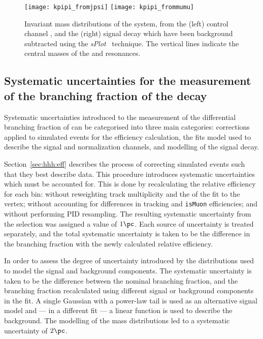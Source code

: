 \begin{figure}
  \begin{center}
    \texttt{[image: kpipi\_fromjpsi]}
    \texttt{[image: kpipi\_frommumu]}
    \caption[Invariant mass distributions of \kpipi]
    {
      Invariant mass distributions of the \kpipi system, from the
      (left) control channel \btojpsikpipi, and the
      (right) signal decay \btokpipimumu
      which have been background subtracted
      using the \emph{sPlot}~\cite{splot} technique.
      The vertical lines indicate the central masses of the  and 
      resonances.
    }
    \label{fig:kpipi:kpipi}
  \end{center}
\end{figure}



\subsection[Systematic uncertainties for the measurement of the branching fraction of the decay
  \btokpipimumu]{Systematic uncertainties for the measurement of the branching fraction of the
    decay \tmath{\btokpipimumu}}
\label{ssec:kpipi:syst}

Systematic uncertainties introduced to the measurement of the differential branching fraction of
\btokpipimumu can be categorised into three main categories:
corrections applied to simulated events for the efficiency calculation,
the fits model used to describe the signal and normalization channels, and
modelling of the signal decay.

Section~\ref{sec:hhh:eff} describes the process of correcting simulated events such that they best
describe data.
This procedure introduces systematic uncertainties which must be accounted for.
This is done by recalculating the relative efficiency for each \qsq bin:
without reweighting track multiplicity and the \chisq of the fit to the \Bp vertex;
without accounting for differences in tracking and {\tt isMuon} efficiencies;
and without performing PID resampling.
The resulting systematic uncertainty from the selection was assigned a value of $1\pc$.
Each source of uncertainty is treated separately, and the total systematic uncertainty is taken to
be the difference in the branching fraction with the newly calculated relative efficiency.

In order to assess the degree of uncertainty introduced by the distributions used to model the
signal and background components.
The systematic uncertainty is taken to be the difference between the nominal branching fraction,
and the branching fraction recalculated using different signal or background components in the fit.
A single Gaussian with a power-law tail is used as an alternative signal model and --- in a
different fit --- a linear function is used to describe the background.
The modelling of the mass distributions led to a systematic uncertainty of $2\pc$.

